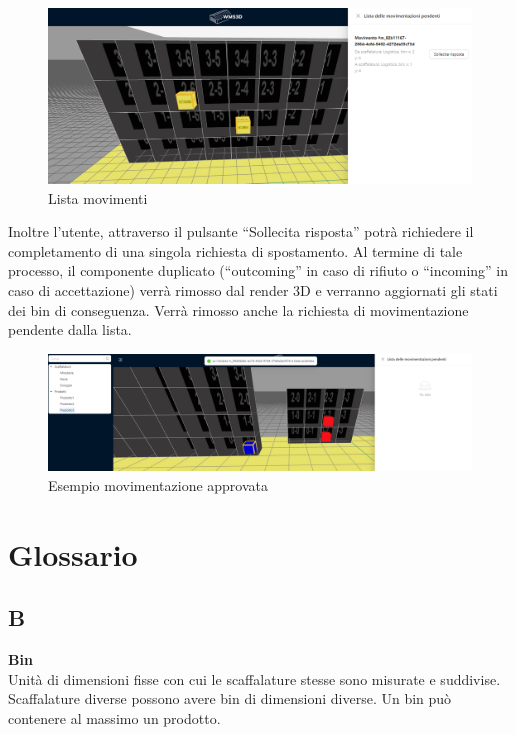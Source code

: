         \begin{figure}[H]
            \centering
            \includegraphics[width=1.0\textwidth]{images/lista_movimenti.png}
            \caption{Lista movimenti}
        \end{figure}
        Inoltre l'utente, attraverso il pulsante ``Sollecita risposta'' potrà richiedere il completamento di una singola richiesta di spostamento.
        Al termine di tale processo, il componente duplicato (``outcoming'' in caso di rifiuto o ``incoming'' in caso di accettazione) verrà rimosso 
        dal render 3D e verranno aggiornati gli stati dei bin di conseguenza. Verrà rimosso anche la richiesta di movimentazione pendente dalla lista.\\
        \begin{figure}[H]
            \centering
            \includegraphics[width=1.0\textwidth]{images/ok_movimento.png}
            \caption{Esempio movimentazione approvata}
        \end{figure}

\newpage
\section{Glossario}
\subsection*{B}
\textbf{Bin}\\
Unità di dimensioni fisse con cui le scaffalature stesse sono misurate e suddivise. Scaffalature diverse possono avere bin di dimensioni diverse. Un bin può contenere al massimo un prodotto.

